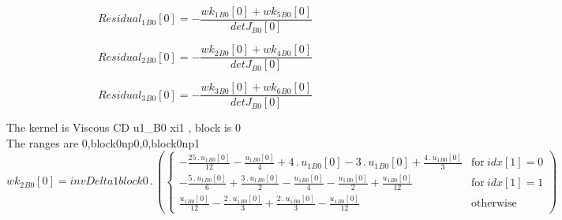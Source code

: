 \documentclass{article}
\begin{document}
\begin{dmath}{Residual_{1}{_{B0}}}[{0}] = - \frac{{wk_{1}{_{B0}}}[{0}] + {wk_{5}{_{B0}}}[{0}]}{{detJ{_{B0}}}[{0}]}\end{dmath}

\begin{dmath}{Residual_{2}{_{B0}}}[{0}] = - \frac{{wk_{2}{_{B0}}}[{0}] + {wk_{4}{_{B0}}}[{0}]}{{detJ{_{B0}}}[{0}]}\end{dmath}

\begin{dmath}{Residual_{3}{_{B0}}}[{0}] = - \frac{{wk_{3}{_{B0}}}[{0}] + {wk_{6}{_{B0}}}[{0}]}{{detJ{_{B0}}}[{0}]}\end{dmath}

\noindent The kernel is Viscous CD u1_B0 xi1 , block is 0\\\noindent The ranges are 0,block0np0,0,block0np1\\\begin{dmath}{wk_{2}{_{B0}}}[{0}] = invDelta1block0 \,.\, \left(\begin{cases} - \frac{25 \,.\, {u_{1}{_{B0}}}[{0}]}{12} - \frac{{u_{1}{_{B0}}}[{0}]}{4} + 4 \,.\, {u_{1}{_{B0}}}[{0}] - 3 \,.\, {u_{1}{_{B0}}}[{0}] + \frac{4 \,.\, 
{u_{1}{_{B0}}}[{0}]}{3} & \text{for}\: {idx}[{1}] = 0 \\- \frac{5 \,.\, {u_{1}{_{B0}}}[{0}]}{6} + \frac{3 \,.\, {u_{1}{_{B0}}}[{0}]}{2} - \frac{{u_{1}{_{B0}}}[{0}]}{4} - \frac{{u_{1}{_{B0}}}[{0}]}{2} + \frac{{u_{1}{_{B0}}}[{0}]}{12} & \text{for}\: 
{idx}[{1}] = 1 \\\frac{{u_{1}{_{B0}}}[{0}]}{12} - \frac{2 \,.\, {u_{1}{_{B0}}}[{0}]}{3} + \frac{2 \,.\, {u_{1}{_{B0}}}[{0}]}{3} - \frac{{u_{1}{_{B0}}}[{0}]}{12} & \text{otherwise} \end{cases}\right)\end{dmath}
\end{document}
